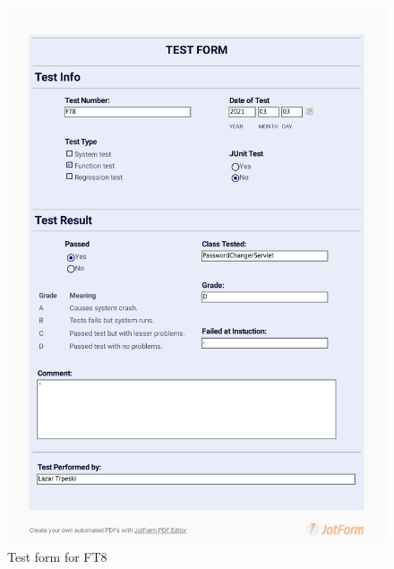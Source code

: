 \documentclass{article}
\begin{document}
 \begin{figure}
     \centering
     \includegraphics[width=13cm]{images/2021-03-03_Lazar_FT8-1}
     \renewcommand\figurename{Figure}
     \caption{Test form for FT8}
     \label{fig:my_label}
 \end{figure}
 
\end{document}
